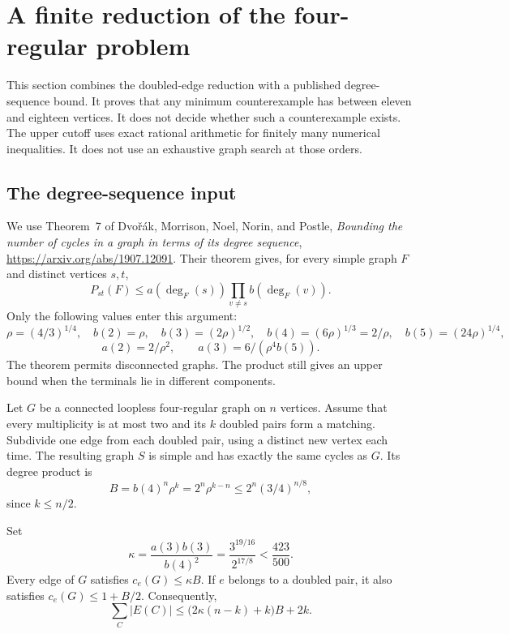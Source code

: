 \section{A finite reduction of the four-regular problem}\label{sec:four-finite}

This section combines the doubled-edge reduction with a published degree-sequence bound.
It proves that any minimum counterexample has between eleven and eighteen vertices.
It does not decide whether such a counterexample exists.
The upper cutoff uses exact rational arithmetic for finitely many numerical inequalities.
It does not use an exhaustive graph search at those orders.

\subsection{The degree-sequence input}

We use Theorem~7 of Dvo\v r\'ak, Morrison, Noel, Norin, and Postle,
\emph{Bounding the number of cycles in a graph in terms of its degree sequence},
\url{https://arxiv.org/abs/1907.12091}.
Their theorem gives, for every simple graph $F$ and distinct vertices $s,t$,
\[
 P_{st}(F)\le a(\deg_F(s))
                \prod_{v\ne s}b(\deg_F(v)).
\]
Only the following values enter this argument:
\[
 \rho=(4/3)^{1/4},\quad b(2)=\rho,\quad
 b(3)=(2\rho)^{1/2},\quad b(4)=(6\rho)^{1/3}=2/\rho,
 \quad b(5)=(24\rho)^{1/4},
\]
\[
 a(2)=2/\rho^2,\qquad a(3)=6/(\rho^4b(5)).
\]
The theorem permits disconnected graphs.
The product still gives an upper bound when the terminals lie in different components.

Let $G$ be a connected loopless four-regular graph on $n$ vertices.
Assume that every multiplicity is at most two and its $k$ doubled pairs form a matching.
Subdivide one edge from each doubled pair, using a distinct new vertex each time.
The resulting graph $S$ is simple and has exactly the same cycles as $G$.
Its degree product is
\begin{equation}\label{eq:core-degree-product}
 B=b(4)^n\rho^k=2^n\rho^{k-n}
 \le2^n(3/4)^{n/8},
\end{equation}
since $k\le n/2$.

\begin{lemma}\label{lem:core-edge-frequency}
Set
\[
 \kappa=\frac{a(3)b(3)}{b(4)^2}
        =\frac{3^{19/16}}{2^{17/8}}<\frac{423}{500}.
\]
Every edge of $G$ satisfies $c_e(G)\le\kappa B$.
If $e$ belongs to a doubled pair, it also satisfies $c_e(G)\le1+B/2$.
Consequently,
\begin{equation}\label{eq:core-length-sum}
 \sum_C|E(C)|
 \le \bigl(2\kappa(n-k)+k\bigr)B+2k.
\end{equation}
\end{lemma}

